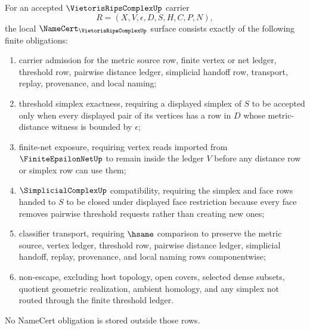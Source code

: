 \begin{theorem}
\label{thm:vietoris-rips-complex-namecert-obligations}
For an accepted $\VietorisRipsComplexUp$ carrier
$$
R=(X,V,\epsilon,D,S,H,C,P,N),
$$
the local $\NameCert_{\VietorisRipsComplexUp}$ surface consists exactly of the following finite obligations:
\begin{enumerate}
\item carrier admission for the metric source row, finite vertex or net ledger, threshold row, pairwise distance ledger, simplicial handoff row, transport, replay, provenance, and local naming;
\item threshold simplex exactness, requiring a displayed simplex of $S$ to be accepted only when every displayed pair of its vertices has a row in $D$ whose metric-distance witness is bounded by $\epsilon$;
\item finite-net exposure, requiring vertex reads imported from $\FiniteEpsilonNetUp$ to remain inside the ledger $V$ before any distance row or simplex row can use them;
\item $\SimplicialComplexUp$ compatibility, requiring the simplex and face rows handed to $S$ to be closed under displayed face restriction because every face removes pairwise threshold requests rather than creating new ones;
\item classifier transport, requiring $\hsame$ comparison to preserve the metric source, vertex ledger, threshold row, pairwise distance ledger, simplicial handoff, replay, provenance, and local naming rows componentwise;
\item non-escape, excluding host topology, open covers, selected dense subsets, quotient geometric realization, ambient homology, and any simplex not routed through the finite threshold ledger.
\end{enumerate}
No NameCert obligation is stored outside those rows.
\end{theorem}
